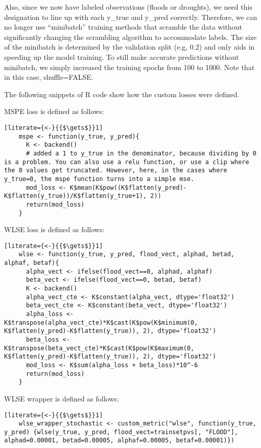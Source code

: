 Also, since we now have labeled observations (floods or droughts), we need this designation to line up with each y\_true and y\_pred correctly. Therefore, we can no longer use ``minibatch'' training methods that scramble the data without significantly changing the scrambling algorithm to accommodate labels. The size of the minibatch is determined by the validation split (e.g, 0.2) and only aids in speeding up the model training. To still make accurate predictions without minibatch, we simply increased the training epochs from 100 to 1000.  Note that in this case, shuffle=FALSE. 

The following snippets of R code show how the custom losses were defined. 

MSPE loss is defined as follows:
\begin{lstlisting}[literate={<-}{{$\gets$}}1]
	mspe <- function(y_true, y_pred){
	  K <- backend()
	  # added a 1 to y_true in the denominator, because dividing by 0 is a problem. You can also use a relu function, or use a clip where the 0 values get truncated. However, here, in the cases where y_true=0, the mspe function turns into a simple mse.
	  mod_loss <- K$mean(K$pow((K$flatten(y_pred)-K$flatten(y_true))/K$flatten(y_true+1), 2))
	  return(mod_loss)
	}
\end{lstlisting}

WLSE loss is defined as follows: 
\begin{lstlisting}[literate={<-}{{$\gets$}}1]
	wlse <- function(y_true, y_pred, flood_vect, alphad, betad, alphaf, betaf){
	  alpha_vect <- ifelse(flood_vect==0, alphad, alphaf)
	  beta_vect <- ifelse(flood_vect==0, betad, betaf)
	  K <- backend()
	  alpha_vect_cte <- K$constant(alpha_vect, dtype='float32')
	  beta_vect_cte <- K$constant(beta_vect, dtype='float32')
	  alpha_loss <- K$transpose(alpha_vect_cte)*K$cast(K$pow(K$minimum(0, K$flatten(y_pred)-K$flatten(y_true)), 2), dtype='float32')
	  beta_loss <- K$transpose(beta_vect_cte)*K$cast(K$pow(K$maximum(0, K$flatten(y_pred)-K$flatten(y_true)), 2), dtype='float32')
	  mod_loss <- K$sum(alpha_loss + beta_loss)*10^-6
	  return(mod_loss)
	}
\end{lstlisting}

WLSE wrapper is defined as follows: 
\begin{lstlisting}[literate={<-}{{$\gets$}}1]
	wlse_wrapper_stochastic <- custom_metric("wlse", function(y_true, y_pred) {wlse(y_true, y_pred, flood_vect=trainsetpvs[, "FLOOD"], alphad=0.00001, betad=0.00005, alphaf=0.00005, betaf=0.00001)})
\end{lstlisting}

